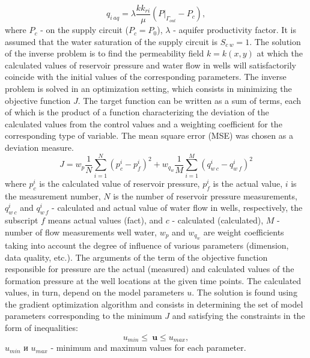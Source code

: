 \documentclass[
11pt,%
tightenlines,%
twoside,%
onecolumn,%
nofloats,%
nobibnotes,%
nofootinbib,%
superscriptaddress,%
noshowpacs,%
centertags]%
{revtex4}
\begin{document}
\begin{equation} \label{qaq}
q_{i\:aq} = \lambda \frac{kk_{ri}}{\mu}(P|_{\Gamma_{out}}-P_c),
\end{equation}
where $P_{c}$ - on the supply circuit ($P_c = P_0$), $\lambda$ - aquifer productivity factor. It is assumed that the water saturation of the supply circuit is $S_{c\:w} = 1$.
The solution of the inverse problem is to find the permeability field $k = k(x,y)$ at which the calculated values of reservoir pressure and water flow in wells will satisfactorily coincide with the initial values of the corresponding parameters. The inverse problem is solved in an optimization setting, which consists in minimizing the objective function $J$. The target function can be written as a sum of terms, each of which is the product of a function characterizing the deviation of the calculated values from the control values and a weighting coefficient for the corresponding type of variable. The mean square error (MSE) was chosen as a deviation measure.
\begin{equation} \label{mse}
	J=w_p\frac{1}{N}\sum_{i=1}^N{\left(p_c^i-p_f^i\right)^2}+w_{q_w}\frac{1}{M}\sum_{i=1}^M{\left(q_{w\:c}^i-q_{w\:f}^i\right)^2}
\end{equation}
where $p_c^i$ is the calculated value of reservoir pressure, $p_f^i$ is the actual value, $i$ is the measurement number, $N$ is the number of reservoir pressure measurements, $q_{w\:c}^i$ and $ q_{w\:f}^i$ - calculated and actual value of water flow in wells, respectively, the subscript $f$ means actual values (fact), and $c$ - calculated (calculated), $M$ - number of flow measurements well water, $w_p$ and $w_{q_w}$ are weight coefficients taking into account the degree of influence of various parameters (dimension, data quality, etc.). The arguments of the term of the objective function responsible for pressure are the actual (measured) and calculated values of the formation pressure at the well locations at the given time points.
 The calculated values, in turn, depend on the model parameters $u$. The solution is found using the gradient optimization algorithm and consists in determining the set of model parameters corresponding to the minimum $J$ and satisfying the constraints in the form of inequalities:
\begin{equation*}
u_{min}\leq\ \boldsymbol{u}\leq u_{max},
\end{equation*}
$u_{min}$ и $u_{max}$ - minimum and maximum values for each parameter.
\end{document}
